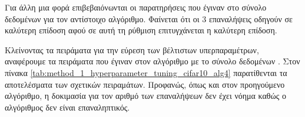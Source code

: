 \begin{table}[h]
    \begin{center}
    \end{center}
    \caption[]{\label{tab:method_1_hyperparameter_tuning_cifar10_alg3}Πίνακας που περιέχει τα πειράματα που έγιναν στο σύνολο  για την αναζήτηση υπερπαραμέτρων στον αλγόριθμο  (αλγόριθμος \ref{alg:dynam_argmax_routing}) για 30 εποχές.}
\end{table}

Για άλλη μια φορά επιβεβαιόνωνται οι παρατηρήσεις που έγιναν στο σύνολο δεδομένων  για τον αντίστοιχο αλγόριθμο. Φαίνεται ότι οι 3 επαναλήψεις οδηγούν σε καλύτερη επίδοση αφού σε αυτή τη ρύθμιση επιτυγχάνεται η καλύτερη επίδοση.

Κλείνοντας τα πειράματα για την εύρεση των βέλτιστων υπερπαραμέτρων, αναφέρουμε τα πειράματα που έγιναν στον αλγόριθμο  με το σύνολο δεδομένων . Στον πίνακα \ref{tab:method_1_hyperparameter_tuning_cifar10_alg4} παρατίθενται τα αποτελέσματα των σχετικών πειραμάτων. Προφανώς, όπως και στον προηγούμενο αλγόριθμο, η δοκιμασία για τον αριθμό των επαναλήψεων δεν έχει νόημα καθώς ο αλγόριθμος δεν είναι επαναληπτικός.

